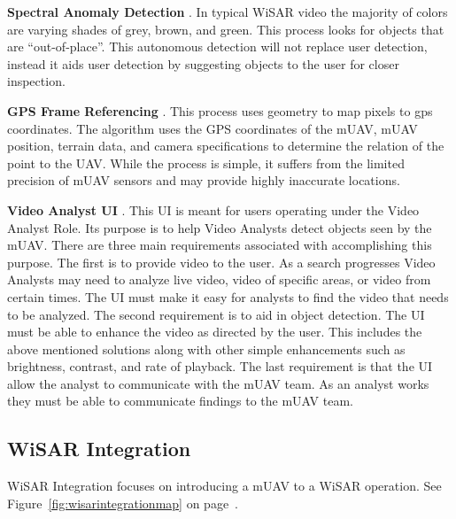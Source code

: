 \documentclass[12pt]{IEEEtran}
\begin{document}
\textbf{Spectral Anomaly Detection} \cite{thornton2011detection,
rasmussen2008enhancement}.  In typical WiSAR video the majority of colors are
varying shades of grey, brown, and green.  This process looks for objects that
are ``out-of-place''.  This autonomous detection will not replace user
detection, instead it aids user detection by suggesting objects to the user for
closer inspection.

\textbf{GPS Frame Referencing} \cite{morse2010coverage}.  This process uses
geometry to map pixels to gps coordinates.  The
algorithm uses the GPS coordinates of the mUAV, mUAV position, terrain data,
and camera specifications to determine the relation of the point to the UAV. 
While the process is simple, it suffers from the limited precision of mUAV
sensors and may provide highly inaccurate locations.

\textbf{Video Analyst UI} \cite{lin2010supporting}.  This UI is meant for users
operating under the Video Analyst Role.  Its purpose is to help Video
Analysts detect objects seen by the mUAV.  There are three main requirements
associated with accomplishing this purpose.  The first is to provide video to
the user.  As a search progresses Video Analysts may need to analyze live video,
video of specific areas, or video from certain times.  The UI must make it easy
for analysts to find the video that needs to be analyzed.  The second
requirement is to aid in object detection.  The UI must be able to enhance the
video as directed by the user.  This includes the above mentioned solutions
along with other simple enhancements such as brightness, contrast, and rate of
playback.  The last requirement is that the UI allow the analyst to communicate
with the mUAV team.  As an analyst works they must be able to communicate
findings to the mUAV team.

\subsection{WiSAR Integration}
WiSAR Integration focuses on introducing a mUAV to a
WiSAR operation.  See Figure~\ref{fig:wisarintegrationmap} on
page~\pageref{fig:wisarintegrationmap}.
\end{document}
